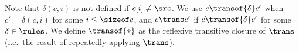 %
Note that $\delta(c,i)$ is not defined if $c[i]\neq\src$.
%
We use \mbox{$c\transof{\delta}c'$} when $c'=\delta(c,i)$ for some
$i\leq\sizeof c$, and $c \trans c'$ if $c\transof{\delta}c'$ for some
$\delta\in\rules$.
%
We define $\transof{*}$ as the reflexive transitive closure of
$\trans$ (i.e.\ the result of repeatedly applying $\trans$).
%

